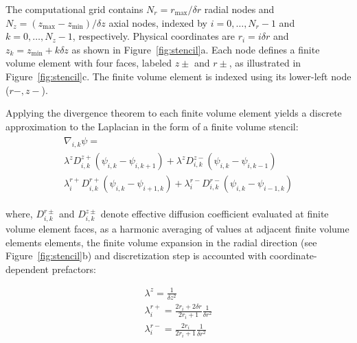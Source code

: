\documentclass[10pt, a4paper, twocolumn]{article}
\begin{document}
The computational grid contains $N_r=r_{\max}/\delta r$ radial nodes and $N_z=(z_{\max}-z_{\min})/\delta z$ axial nodes, indexed by $i=0,\dots,N_r-1$ and $k=0,\dots,N_z-1$, respectively.
Physical coordinates are $r_i=i\delta r$ and $z_k=z_{\min}+k\delta z$ as shown in Figure~\ref{fig:stencil}a.
Each node defines a finite volume element with four faces, labeled $z\pm$ and $r\pm$, as illustrated in Figure~\ref{fig:stencil}c.
The finite volume element is indexed using its lower-left node ($r-, z-$).

Applying the divergence theorem to each finite volume element yields a discrete approximation to the Laplacian in the form of a finite volume stencil:
\begin{eqnarray}
    \begin{aligned} 
        \nabla_{i,k} \psi = 
        \\
        \lambda^{z} D^{z+}_{i,k} (\psi_{i,k} - \psi_{i,k+1}) +  \lambda^{z} D^{z-}_{i,k} (\psi_{i,k} - \psi_{i,k-1})\\
        \lambda^{r+}_{i} D^{r+}_{i,k} (\psi_{i,k} - \psi_{i+1,k}) +  \lambda^{r-}_{i} D^{r-}_{i,k} (\psi_{i,k} - \psi_{i-1,k})
    \end{aligned}
    \label{eq:FV_divergence}
\end{eqnarray}

where, $D^{r\pm}_{i,k}$ and $D^{z\pm}_{i,k}$ denote effective diffusion coefficient evaluated at finite volume element faces, as a harmonic averaging of values at adjacent finite volume elements elements, 
the finite volume expansion in the radial direction (see Figure~\ref{fig:stencil}b) and discretization step is accounted with coordinate-dependent prefactors:

\begin{eqnarray}
    \lambda^{z} = \frac{1}{\delta z^2}\\
    \lambda^{r+}_{i} = \frac{2 r_i + 2 \delta r}{2 r_i + 1} \frac {1}{\delta r^2}\\
    \lambda^{r-}_{i} = \frac{2 r_i}{2 r_i + 1} \frac {1}{\delta r^2}
\end{eqnarray}
\end{document}
